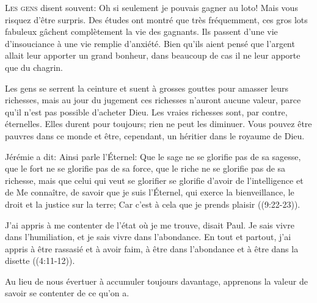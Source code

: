 \lettrine{L}{es gens} disent souvent: 
 \Og Oh si seulement je pouvais gagner au loto! \Fg{}
 Mais vous risquez d'être surpris. Des études ont montré
 que très fréquemment, ces gros lots fabuleux gâchent complètement
 la vie des gagnants. Ils passent d'une vie d'insouciance
 à une vie remplie d'anxiété. Bien qu'ils aient pensé
 que l'argent allait leur apporter un grand bonheur,
 dans beaucoup de cas il ne leur apporte que du chagrin.

Les gens se serrent la ceinture et suent à grosses gouttes
 pour amasser leurs richesses, mais au jour du jugement
 ces richesses n'auront aucune valeur, parce qu'il n'est pas possible
 d'acheter Dieu. Les vraies richesses sont, par contre, éternelles.
 Elles durent pour toujours; rien ne peut les diminuer.
 Vous pouvez être pauvres dans ce monde et être, cependant,
 un héritier dans le royaume de Dieu.


Jérémie a dit: 
 \Og Ainsi parle l'Éternel: Que le sage ne se glorifie pas de sa sagesse,
 que le fort ne se glorifie pas de sa force, que le riche ne se glorifie pas
 de sa richesse, mais que celui qui veut se glorifier se glorifie d'avoir
 de l'intelligence et de Me connaître, de savoir que je suis l'Éternel,
 qui exerce la bienveillance, le droit et la justice sur la terre;
 Car c'est à cela que je prends plaisir \Fg{} 
 ((9:22-23)).

\Og J'ai appris à me contenter de l'état où je me trouve, disait Paul.
 Je sais vivre dans l'humiliation, et je sais vivre dans l'abondance.
 En tout et partout, j'ai appris à être rassasié et à avoir faim,
 à être dans l'abondance et à être dans la disette \Fg{} 
 ((4:11-12)).

Au lieu de nous évertuer à accumuler toujours davantage, apprenons la valeur
 de savoir se contenter de ce qu'on a. 

\dvrule







